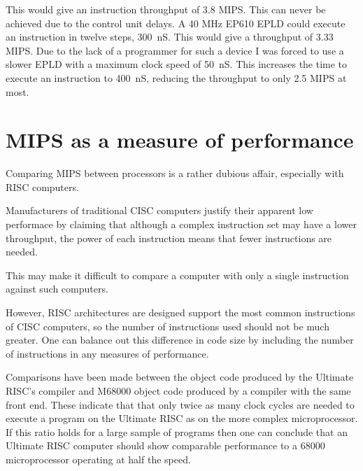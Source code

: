 This would give an instruction throughput of 3.8 MIPS.
This can never be achieved due to the control unit delays.
A 40 MHz EP610 EPLD could execute an instruction in twelve steps, 300~nS. This would give a throughput of 3.33 MIPS. 
Due to the lack of a programmer for such a device I was forced to use a slower EPLD with a maximum clock speed of 50~nS.
This increases the time to execute an instruction to 400~nS, reducing the throughput to only 2.5 MIPS at most.

\section{MIPS as a measure of performance}
Comparing MIPS between processors is a rather dubious affair, especially with RISC computers.

Manufacturers of traditional CISC computers justify their apparent low performace by claiming that although a complex instruction set may have a lower throughput, the power of each instruction  means that fewer instructions are needed.

This may make it difficult to compare a computer with only a single instruction against such computers.

However, RISC architectures are designed support the most common instructions of CISC computers, so the number of instructions used  should not be  much greater.
One can balance out this difference in code size by including the number of instructions in any measures of performance.

Comparisons have been made between the object code produced by the Ultimate RISC's compiler and M68000 object code produced by a compiler with the same front end.
These indicate that that only twice as many clock cycles are needed to execute a program on the Ultimate RISC as on the more complex microprocessor.
If this ratio holds for a large sample of programs then one can conclude that an Ultimate RISC computer should show  comparable performance to a 68000 microprocessor operating at half the speed.


